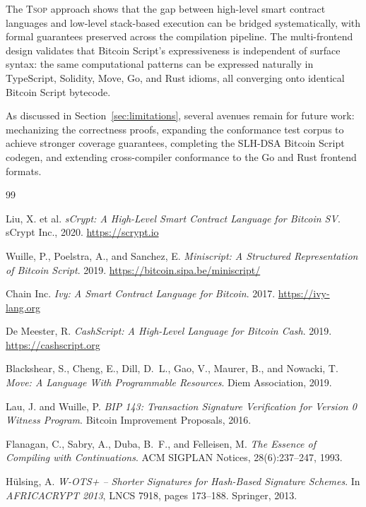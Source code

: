 \documentclass[11pt,a4paper]{article}
\newcommand{\tsop}{\textsc{Tsop}}
\begin{document}
The \tsop{} approach shows that the gap between high-level smart contract
languages and low-level stack-based execution can be bridged systematically,
with formal guarantees preserved across the compilation pipeline. The
multi-frontend design validates that Bitcoin Script's expressiveness is
independent of surface syntax: the same computational patterns can be
expressed naturally in TypeScript, Solidity, Move, Go, and Rust idioms,
all converging onto identical Bitcoin Script bytecode.

As discussed in Section~\ref{sec:limitations}, several avenues remain for
future work: mechanizing the correctness proofs, expanding the conformance
test corpus to achieve stronger coverage guarantees, completing the SLH-DSA
Bitcoin Script codegen, and extending cross-compiler conformance to the Go
and Rust frontend formats.


\begin{thebibliography}{99}

Liu, X. et al.
\textit{sCrypt: A High-Level Smart Contract Language for Bitcoin SV}.
sCrypt Inc., 2020.
\url{https://scrypt.io}

Wuille, P., Poelstra, A., and Sanchez, E.
\textit{Miniscript: A Structured Representation of Bitcoin Script}.
2019.
\url{https://bitcoin.sipa.be/miniscript/}

Chain Inc.
\textit{Ivy: A Smart Contract Language for Bitcoin}.
2017.
\url{https://ivy-lang.org}

De Meester, R.
\textit{CashScript: A High-Level Language for Bitcoin Cash}.
2019.
\url{https://cashscript.org}

Blackshear, S., Cheng, E., Dill, D.~L., Gao, V., Maurer, B., and Nowacki, T.
\textit{Move: A Language With Programmable Resources}.
Diem Association, 2019.

Lau, J. and Wuille, P.
\textit{BIP 143: Transaction Signature Verification for Version 0 Witness Program}.
Bitcoin Improvement Proposals, 2016.

Flanagan, C., Sabry, A., Duba, B.~F., and Felleisen, M.
\textit{The Essence of Compiling with Continuations}.
ACM SIGPLAN Notices, 28(6):237--247, 1993.

H{\"u}lsing, A.
\textit{W-OTS+ -- Shorter Signatures for Hash-Based Signature Schemes}.
In \textit{AFRICACRYPT 2013}, LNCS 7918, pages 173--188. Springer, 2013.

\end{thebibliography}
\end{document}
